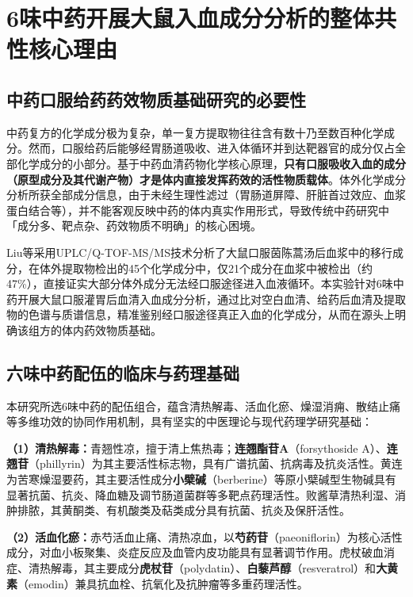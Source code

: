 \documentclass[12pt,a4paper,UTF8,openany]{ctexbook}
\newcommand{\compoundname}[1]{\textbf{#1}}
\newcommand{\keyterm}[1]{\textbf{#1}}
\begin{document}
\section{6味中药开展大鼠入血成分分析的整体共性核心理由}

\subsection{中药口服给药药效物质基础研究的必要性}

中药复方的化学成分极为复杂，单一复方提取物往往含有数十乃至数百种化学成分。然而，口服给药后能够经胃肠道吸收、进入体循环并到达靶器官的成分仅占全部化学成分的小部分。基于中药血清药物化学核心原理，\keyterm{只有口服吸收入血的成分（原型成分及其代谢产物）才是体内直接发挥药效的活性物质载体}\cite{Wang2016}。体外化学成分分析所获全部成分信息，由于未经生理性滤过（胃肠道屏障、肝脏首过效应、血浆蛋白结合等），并不能客观反映中药的体内真实作用形式，导致传统中药研究中「成分多、靶点杂、药效物质不明确」的核心困境。

Liu等\cite{Liu2008}采用UPLC/Q-TOF-MS/MS技术分析了大鼠口服茵陈蒿汤后血浆中的移行成分，在体外提取物检出的45个化学成分中，仅21个成分在血浆中被检出（约47\%），直接证实大部分体外成分无法经口服途径进入血液循环。本实验针对6味中药开展大鼠口服灌胃后血清入血成分分析，通过比对空白血清、给药后血清及提取物的色谱与质谱信息，精准鉴别经口服途径真正入血的化学成分，从而在源头上明确该组方的体内药效物质基础。

\subsection{六味中药配伍的临床与药理基础}

本研究所选6味中药的配伍组合，蕴含清热解毒、活血化瘀、燥湿消痈、散结止痛等多维功效的协同作用机制，具有坚实的中医理论与现代药理学研究基础：

\textbf{（1）清热解毒：}青翘性凉，擅于清上焦热毒；\compoundname{连翘酯苷A}（forsythoside A）、\compoundname{连翘苷}（phillyrin）为其主要活性标志物，具有广谱抗菌、抗病毒及抗炎活性\cite{Review2021FA}。黄连为苦寒燥湿要药，其主要活性成分\compoundname{小檗碱}（berberine）等原小檗碱型生物碱具有显著抗菌、抗炎、降血糖及调节肠道菌群等多靶点药理活性\cite{FengX2021}。败酱草清热利湿、消肿排脓，其黄酮类、有机酸类及萜类成分具有抗菌、抗炎及保肝活性\cite{Gong2021}。

\textbf{（2）活血化瘀：}赤芍活血止痛、清热凉血，以\compoundname{芍药苷}（paeoniflorin）为核心活性成分，对血小板聚集、炎症反应及血管内皮功能具有显著调节作用\cite{Hu2020}。虎杖破血消症、清热解毒，其主要成分\compoundname{虎杖苷}（polydatin）、\compoundname{白藜芦醇}（resveratrol）和\compoundname{大黄素}（emodin）兼具抗血栓、抗氧化及抗肿瘤等多重药理活性\cite{Yang2024}。
\end{document}
